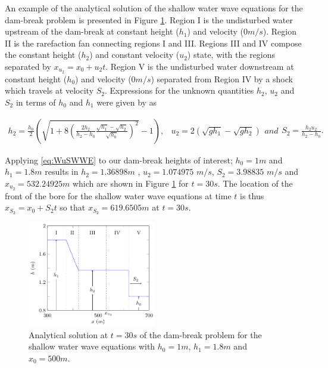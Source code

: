 \documentclass[times]{elsarticle}
\begin{document}
An example of the analytical solution of the shallow water wave equations for the dam-break problem is presented in Figure \ref{fig:SWWEanadiagram}. Region I is the undisturbed water upstream of the dam-break at constant height ($h_1$) and velocity ($0m/s$). Region II is the rarefaction fan connecting regions I and III. Regions III and IV compose the constant height ($h_2$) and constant velocity ($u_2$) state, with the regions separated by $x_{u_2} = x_0 + u_2t$. Region V is the undisturbed water downstream at constant height ($h_0$) and velocity ($0m/s$) separated from Region IV by a shock which travels at velocity $S_2$. Expressions for the unknown quantities $h_2$, $u_2$ and $S_2$ in terms of $h_0$ and $h_1$ were given by \citet{Wu-etal-1999-1210} as 
\begin{linenomath*}
\begin{subequations}
\begin{gather}
h_2 = \frac{h_0}{2} \left(\sqrt{1 + 8 \left(\frac{2h_2}{h_2 - h_0}\frac{\sqrt{h_1} - \sqrt{h_2}}{\sqrt{h_0}}\right)^2} - 1\right),
\end{gather}
	\begin{gather}
	u_2 = 2\left(\sqrt{gh_1} - \sqrt{gh_2}\right)
	\end{gather}
and
	\begin{gather}
	S_2 = \frac{h_2 u_2}{h_2 - h_0}.
	\end{gather}
\label{eq:WuSWWE}	
\end{subequations}
\end{linenomath*}
Applying \eqref{eq:WuSWWE} to our dam-break heights of interest; $h_0 =1m$ and $h_1 = 1.8m$ results in $h_2 = 1.36898m$ , $u_2 = 1.074975$ $m/s$, $S_2 = 3.98835$ $m/s$ and $x_{u_2} = 532.24925m$ which are shown in Figure \ref{fig:SWWEanadiagram} for $t=30s$. The location of the front of the bore for the shallow water wave equations at time $t$ is thus $x_{S_2} = x_0 + S_2 t$ so that $x_{S_2} = 619.6505m$ at $t=30s$.

\begin{figure}
	\centering
	\includegraphics[width=0.5\textwidth]{Figure-2.pdf}
	\caption{Analytical solution at $t=30s$ of the dam-break problem for the shallow water wave equations with $h_0 = 1m$, $h_1=1.8m$ and $x_0=500m$.}
	\label{fig:SWWEanadiagram}
\end{figure}
\end{document}
